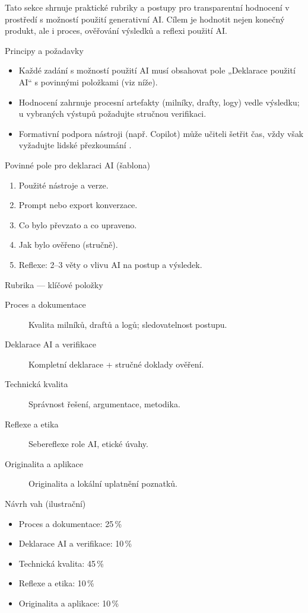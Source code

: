 \documentclass{report}%
\begin{document}
%
Tato sekce shrnuje praktické rubriky a postupy pro transparentní hodnocení v prostředí s možností použití generativní AI. Cílem je hodnotit nejen konečný produkt, ale i proces, ověřování výsledků a reflexi použití AI.

Principy a požadavky
\begin{itemize}
  \item Každé zadání s možností použití AI musí obsahovat pole „Deklarace použití AI“ s povinnými položkami (viz níže).
  \item Hodnocení zahrnuje procesní artefakty (milníky, drafty, logy) vedle výsledku; u vybraných výstupů požadujte stručnou verifikaci.
  \item Formativní podpora nástroji (např. Copilot) může učiteli šetřit čas, vždy však vyžadujte lidské přezkoumání \cite{kb_ai_101_tipu_pdf_04e4a115_page_21_2}.
\end{itemize}

Povinné pole pro deklaraci AI (šablona)
\begin{enumerate}
  \item Použité nástroje a verze.
  \item Prompt nebo export konverzace.
  \item Co bylo převzato a co upraveno.
  \item Jak bylo ověřeno (stručně).
  \item Reflexe: 2–3 věty o vlivu AI na postup a výsledek.
\end{enumerate}

Rubrika — klíčové položky
\begin{description}
  \item[Proces a dokumentace] Kvalita milníků, draftů a logů; sledovatelnost postupu.
  \item[Deklarace AI a verifikace] Kompletní deklarace + stručné doklady ověření.
  \item[Technická kvalita] Správnost řešení, argumentace, metodika.
  \item[Reflexe a etika] Sebereflexe role AI, etické úvahy.
  \item[Originalita a aplikace] Originalita a lokální uplatnění poznatků.
\end{description}

Návrh vah (ilustrační)
\begin{itemize}
  \item Proces a dokumentace: 25\,\%
  \item Deklarace AI a verifikace: 10\,\%
  \item Technická kvalita: 45\,\%
  \item Reflexe a etika: 10\,\%
  \item Originalita a aplikace: 10\,\%
\end{itemize}
\end{document}
